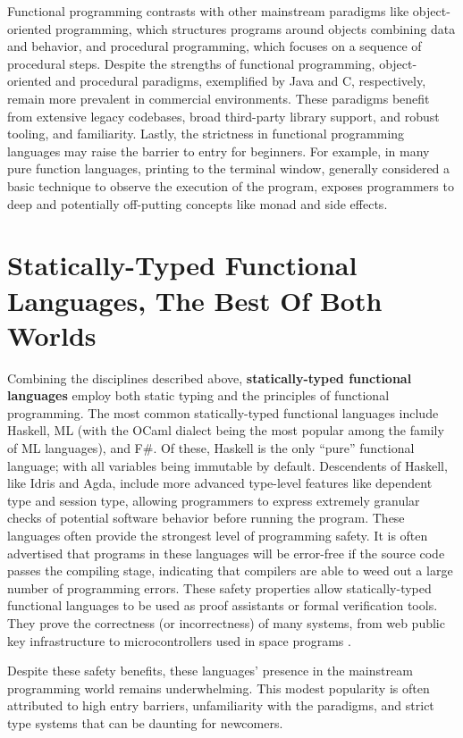 Functional programming contrasts with other mainstream paradigms like object-oriented programming, which structures programs around objects combining data and behavior, and procedural programming, which focuses on a sequence of procedural steps. Despite the strengths of functional programming, object-oriented and procedural paradigms, exemplified by Java and C, respectively, remain more prevalent in commercial environments. These paradigms benefit from extensive legacy codebases, broad third-party library support, and robust tooling, and familiarity. Lastly, the strictness in functional programming languages may raise the barrier to entry for beginners. For example, in many pure function languages, printing to the terminal window, generally considered a basic technique to observe the execution of the program, exposes programmers to deep and potentially off-putting concepts like monad and side effects.  


\section{Statically-Typed Functional Languages, The Best Of Both Worlds}
Combining the disciplines described above, \textbf{statically-typed functional languages} employ both static typing and the principles of functional programming. The most common statically-typed functional languages include Haskell,  ML (with the OCaml dialect being the most popular among the family of ML languages), and F\#. 
Of these, Haskell is the only ``pure'' functional language; with all variables being immutable by default.
Descendents of Haskell, like Idris and Agda, include more advanced type-level features like dependent type and session type, allowing programmers to express extremely granular checks of potential software behavior before running the program. These languages often provide the strongest level of programming safety. It is often advertised that programs in these languages will be error-free if the source code passes the compiling stage, indicating that compilers are able to weed out a large number of programming errors. These safety properties allow statically-typed functional languages to be used as proof assistants or formal verification tools. They prove the correctness (or incorrectness) of many systems, from web public key infrastructure \cite{Bhargavan2021-no} to microcontrollers used in space programs \cite{Mokhov2019-zj}. 

Despite these safety benefits, these languages' presence in the mainstream programming world remains underwhelming. This modest popularity is often attributed to high entry barriers, unfamiliarity with the paradigms, and strict type systems that can be daunting for newcomers.

